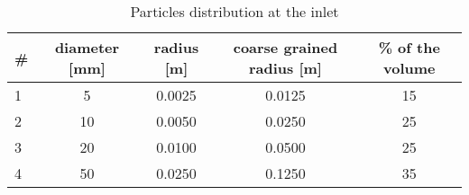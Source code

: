 \begin{table}[htbp]
  \centering
  \caption{Particles distribution at the inlet}
    \begin{tabular}{l|cccc}
    \hline
    \#    & diameter [mm] & radius [m] & coarse grained radius [m] & \% of the
    volume
    \\
    \hline
    1     & 5     & 0.0025 & 0.0125 & 15 \\
    2     & 10    & 0.0050 & 0.0250 & 25 \\
    3     & 20    & 0.0100 & 0.0500 & 25 \\
    4     & 50    & 0.0250 & 0.1250 & 35 \\
    \hline
    \end{tabular}%
  \label{tab:radii}%
\end{table}%
